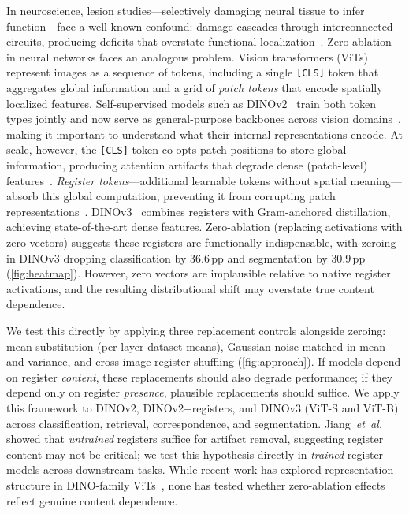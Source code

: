 \documentclass[10pt,twocolumn,letterpaper]{article}
\begin{document}
In neuroscience, lesion studies---selectively damaging neural tissue to infer function---face a well-known confound: damage cascades through interconnected circuits, producing deficits that overstate functional localization~\cite{jonas2017microprocessor}. Zero-ablation in neural networks faces an analogous problem.
Vision transformers (ViTs)~\cite{dosovitskiy2021vit} represent images as a sequence of tokens, including a single \texttt{[CLS]} token that aggregates global information and a grid of \emph{patch tokens} that encode spatially localized features. Self-supervised models such as DINOv2~\cite{oquab2024dinov2} train both token types jointly and now serve as general-purpose backbones across vision domains~\cite{segado2025grounding,parodi2025primateface}, making it important to understand what their internal representations encode. At scale, however, the \texttt{[CLS]} token co-opts patch positions to store global information, producing attention artifacts that degrade dense (patch-level) features~\cite{darcet2024registers}.
\emph{Register tokens}---additional learnable tokens without spatial meaning---absorb this global computation, preventing it from corrupting patch representations~\cite{darcet2024registers}. DINOv3~\cite{simeoni2025dinov3} combines registers with Gram-anchored distillation, achieving state-of-the-art dense features.
Zero-ablation (replacing activations with zero vectors) suggests these registers are functionally indispensable, with zeroing in DINOv3 dropping classification by $36.6$\,pp and segmentation by $30.9$\,pp (\cref{fig:heatmap}).
However, zero vectors are implausible relative to native register activations, and the resulting distributional shift may overstate true content dependence.

We test this directly by applying three replacement controls alongside zeroing: mean-substitution (per-layer dataset means), Gaussian noise matched in mean and variance, and cross-image register shuffling (\cref{fig:approach}). If models depend on register \emph{content}, these replacements should also degrade performance; if they depend only on register \emph{presence}, plausible replacements should suffice.
We apply this framework to DINOv2, DINOv2+registers, and DINOv3 (ViT-S and ViT-B) across classification, retrieval, correspondence, and segmentation.
Jiang~\textit{et~al.}~\cite{jiang2025notrained} showed that \emph{untrained} registers suffice for artifact removal, suggesting register content may not be critical; we test this hypothesis directly in \emph{trained}-register models across downstream tasks.
While recent work has explored representation structure in DINO-family ViTs~\cite{lappe2025decoupling,marouani2026revisiting,fel2026rabbithull}, none has tested whether zero-ablation effects reflect genuine content dependence.
\end{document}
